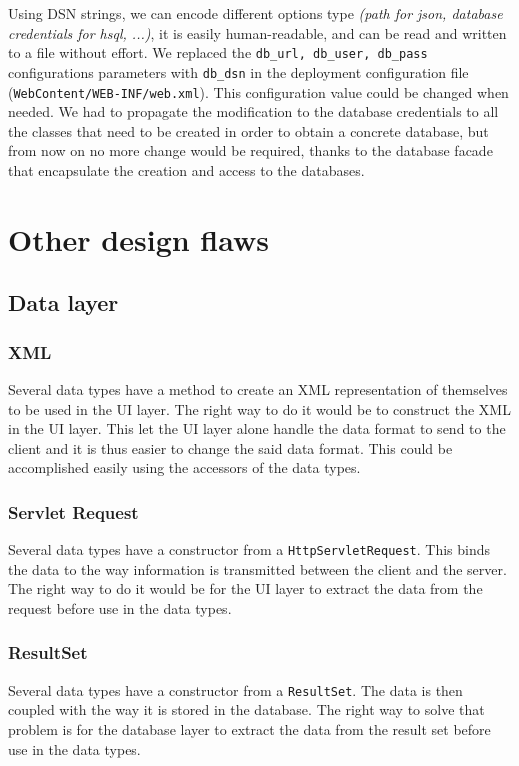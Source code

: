 Using DSN strings, we can encode different options type \textit{(path for json, database credentials for hsql, ...)}, it is easily human-readable, and can be read and written to a file without effort. We replaced the \texttt{db\_url, db\_user, db\_pass} configurations parameters with \texttt{db\_dsn} in the deployment configuration file (\texttt{WebContent/WEB-INF/web.xml}). This configuration value could be changed when needed. We had to propagate the modification to the database credentials to all the classes that need to be created in order to obtain a concrete database, but from now on no more change would be required, thanks to the database facade that encapsulate the creation and access to the databases.


\section{Other design flaws}

\subsection{Data layer}

\subsubsection{XML}
Several data types have a method to create an XML representation of themselves to be used in the UI layer. The right way to do it would be to construct the XML in the UI layer. This let the UI layer alone handle the data format to send to the client and it is thus easier to change the said data format. This could be accomplished easily using the accessors of the data types.

\subsubsection{Servlet Request}
Several data types have a constructor from a \texttt{HttpServletRequest}. This binds the data to the way information is transmitted between the client and the server. The right way to do it would be for the UI layer to extract the data from the request before use in the data types.

\subsubsection{ResultSet}
Several data types have a constructor from a \texttt{ResultSet}. The data is then coupled with the way it is stored in the database. The right way to solve that problem is for the database layer to extract the data from the result set before use in the data types.

